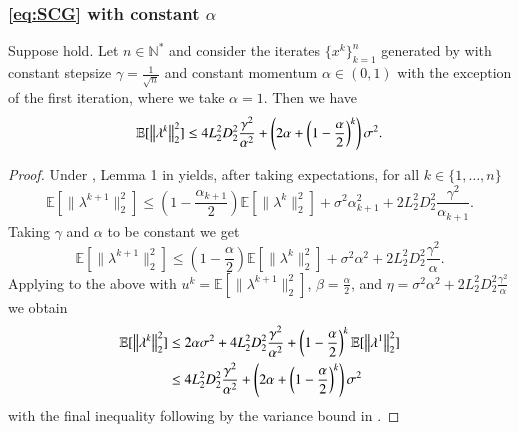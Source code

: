 \begin{toappendix}
\subsubsection{\ref{eq:SCG} with constant $\alpha$}\label{subsec:SCGconstant}
\begin{lemma}\label{lem:SCGconstanterror}
    Suppose  hold. Let $n\in\mathbb{N}^*$ and consider the iterates $\{x^k\}_{k=1}^n$ generated by  with constant stepsize $\gamma=\tfrac{1}{\sqrt{n}}$ and constant momentum $\alpha \in(0,1)$ with the exception of the first iteration, where we take $\alpha=1$. Then we have
    \begin{equation*}
        \mathbb{E}[\left\Vert{\lambda^k}\right\Vert_2^2] \leq 4L_2^2D_2^2\frac{\gamma^2}{\alpha^2} + \left(2\alpha + \left(1-\frac{\alpha}{2}\right)^k\right)\sigma^2.
    \end{equation*}
\end{lemma}
\begin{proof}
    Under , Lemma 1 in \citet{mokhtari2020stochastic} yields, after taking expectations, for all $k\in\{1,\ldots,n\}$
    \begin{equation*}
        \mathbb{E}[\| \lambda^{k+1}\|_2^2] \leq (1-\frac{\alpha_{k+1}}{2})\mathbb{E}[\| \lambda^k\|_2^2] + \sigma^2\alpha_{k+1}^2 + 2L_2^2D_2^2\frac{\gamma^2}{\alpha_{k+1}}.
    \end{equation*}
    Taking $\gamma$ and $\alpha$ to be constant we get
    \begin{equation*}
        \mathbb{E}[\| \lambda^{k+1}\|_2^2] \leq (1-\frac{\alpha}{2})\mathbb{E}[\| \lambda^k\|_2^2] + \sigma^2\alpha^2 + 2L_2^2D_2^2\frac{\gamma^2}{\alpha}.
    \end{equation*}
    Applying  to the above with $u^k =\mathbb{E}[\| \lambda^{k+1}\|_2^2]$, $\beta = \frac{\alpha}{2}$, and $\eta = \sigma^2\alpha^2 + 2L_2^2D_2^2\frac{\gamma^2}{\alpha}$ we obtain
    \begin{equation*}
        \begin{aligned}
            \mathbb{E}[\left\Vert{\lambda^{k}}\right\Vert_2^2]
                &\leq 2\alpha\sigma^2 + 4L_2^2D_2^2\frac{\gamma^2}{\alpha^2} + \left(1-\frac{\alpha}{2}\right)^k\mathbb{E}[\left\Vert{\lambda^{1}}\right\Vert_2^2]\\
                &\leq 4L_2^2D_2^2\frac{\gamma^2}{\alpha^2} + \left(2\alpha + \left(1-\frac{\alpha}{2}\right)^k\right)\sigma^2
        \end{aligned}
    \end{equation*}
    with the final inequality following by the variance bound in .
\end{proof}

\end{toappendix}

